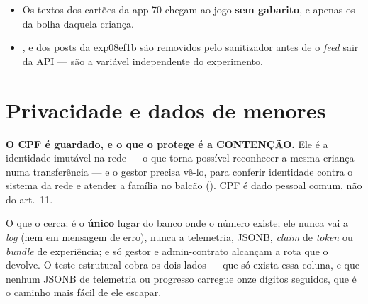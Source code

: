 \begin{regra}
\begin{itemize}
    servidor até a Galeria Oculta abrir --- e, depois dela, o contrafactual
    \enquote{sem as suas curtidas} desce já calculado, nunca o motor
    (). A separação é feita nas pastas do salvar, no feed, e o
    servidor a corrige no voto sem dizer o acerto (); na regra
    SE \ldots{} ENTÃO, as peças descem sem a marca
    de certa, com ids opacos , e a certa só desce DEPOIS do envio
    (; os pacotes da curtida saíram com a , e a
    cadeia, o par simulado e as enquetes com a , e o caso Mariana
    com a ). O que NÃO é segredo: o post mostra a área (o perfil
    e a \emph{hashtag}) ao lado do Salvar, e a pasta certa está ao alcance de
    quem lê o post --- o risco aceito na ; quem corrige é o
    servidor.
  \item Os textos dos cartões da app-70 chegam ao jogo \textbf{sem gabarito}, e
    apenas os da bolha daquela criança.
  \item {},  e  dos posts da exp08ef1b são
    removidos pelo sanitizador antes de o \emph{feed} sair da API --- são a
    variável independente do experimento.
\end{itemize}
\end{regra}

\section{Privacidade e dados de menores}

\begin{atencao}
\textbf{O CPF é guardado, e o que o protege é a CONTENÇÃO.} Ele é a identidade
imutável na rede --- o que torna possível reconhecer a mesma criança numa
transferência --- e o gestor precisa vê-lo, para conferir identidade contra o
sistema da rede e atender a família no balcão (). CPF é dado pessoal
comum, não do art.~11.

O que o cerca:  é o \textbf{único} lugar do banco onde o número
existe; ele nunca vai a \emph{log} (nem em mensagem de erro), nunca a telemetria,
JSONB, \emph{claim} de \emph{token} ou \emph{bundle} de experiência; e só gestor e
admin-contrato alcançam a rota que o devolve. O teste estrutural cobra os dois
lados --- que só exista essa coluna, e que nenhum JSONB de telemetria ou progresso
carregue onze dígitos seguidos, que é o caminho mais fácil de ele escapar.
\end{atencao}

